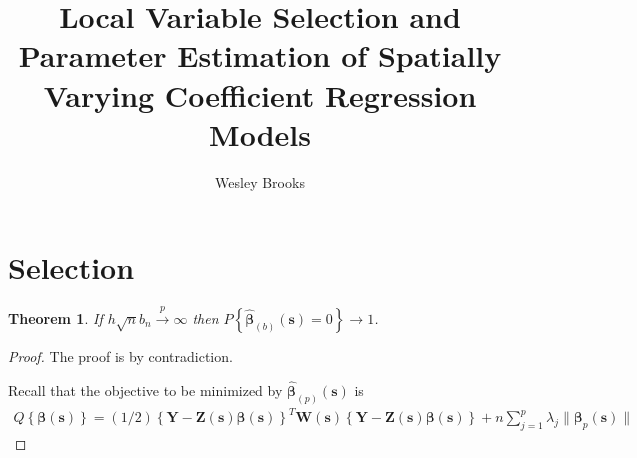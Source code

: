 \documentclass[authoryear, review, 11pt]{elsarticle}
\title{Local Variable Selection and Parameter Estimation of Spatially Varying Coefficient Regression Models}
\author{Wesley Brooks}
\date{}                                           %
\newtheorem{theorem}{Theorem}[section]
\begin{document}
    \section{Selection}
    
    \begin{theorem}\label{theorem:selection}   
      If $h \sqrt{n} b_n \xrightarrow{p} \infty$ then $P \left\{ \hat{\bm{\beta}}_{(b)} (\bm{s}) = 0 \right\} \to 1$.
    \end{theorem}

    \begin{proof}
      The proof is by contradiction.
      
      Recall that the objective to be minimized by $\hat{\bm{\beta}}_{(p)} (\bm{s})$ is
      \begin{align}\label{eq:objective}
        Q \left\{ \bm{\beta}(\bm{s}) \right\} = (1/2) \left\{ \bm{Y} - \bm{Z}(\bm{s}) \bm{\beta}(\bm{s}) \right\}^T \bm{W}(\bm{s}) \left\{ \bm{Y} - \bm{Z}(\bm{s}) \bm{\beta}(\bm{s}) \right\} + n \sum_{j=1}^p \lambda_j \| \bm{\beta}_p(\bm{s}) \|
      \end{align}


\end{proof}
\end{document}
